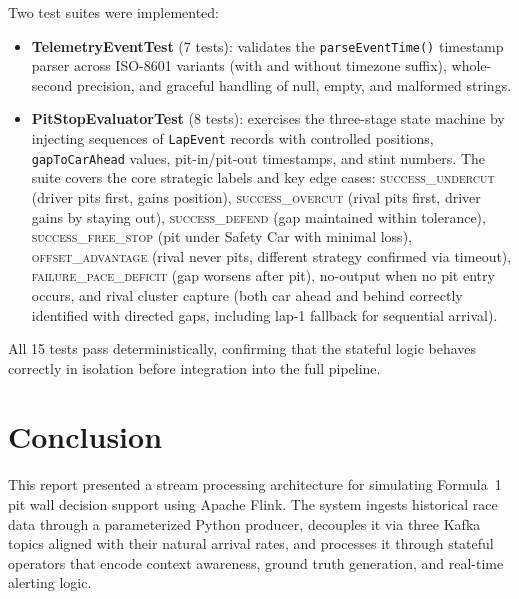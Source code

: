 \documentclass[a4paper,twocolumn]{article}
\begin{document}
Two test suites were implemented:
\begin{itemize}
  \item \textbf{TelemetryEventTest} (7 tests): validates the
    \texttt{parseEventTime()} timestamp parser across ISO-8601 variants
    (with and without timezone suffix), whole-second precision, and
    graceful handling of null, empty, and malformed strings.
  \item \textbf{PitStopEvaluatorTest} (8 tests): exercises the
    three-stage state machine by injecting sequences of
    \texttt{LapEvent} records with controlled positions,
    \texttt{gapToCarAhead} values, pit-in/pit-out timestamps, and stint
    numbers. The suite covers the core strategic labels and key edge
    cases:
    \textsc{success\_undercut} (driver pits first, gains position),
    \textsc{success\_overcut} (rival pits first, driver gains by staying
    out), \textsc{success\_defend} (gap maintained within tolerance),
    \textsc{success\_free\_stop} (pit under Safety Car with minimal
    loss), \textsc{offset\_advantage} (rival never pits, different
    strategy confirmed via timeout), \textsc{failure\_pace\_deficit}
    (gap worsens after pit), no-output when no pit entry occurs, and
    rival cluster capture (both car ahead and behind correctly
    identified with directed gaps, including lap-1 fallback for
    sequential arrival).
\end{itemize}

All 15 tests pass deterministically, confirming that the stateful logic
behaves correctly in isolation before integration into the full pipeline.

\section{Conclusion}

This report presented a stream processing architecture for simulating
Formula~1 pit wall decision support using Apache Flink. The system
ingests historical race data through a parameterized Python producer,
decouples it via three Kafka topics aligned with their natural arrival
rates, and processes it through stateful operators that encode context
awareness, ground truth generation, and real-time alerting logic.
\end{document}
